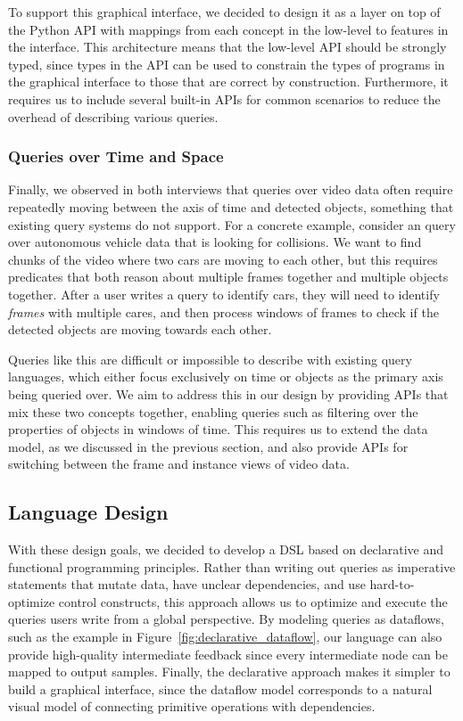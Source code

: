 To support this graphical interface, we decided to design it as a layer on top of the Python API with mappings from each concept in the low-level to features in the interface. This architecture means that the low-level API should be strongly typed, since types in the API can be used to constrain the types of programs in the graphical interface to those that are correct by construction. Furthermore, it requires us to include several built-in APIs for common scenarios to reduce the overhead of describing various queries.

\subsubsection{Queries over Time and Space}
Finally, we observed in both interviews that queries over video data often require repeatedly moving between the axis of time and detected objects, something that existing query systems do not support. For a concrete example, consider an query over autonomous vehicle data that is looking for collisions. We want to find chunks of the video where two cars are moving to each other, but this requires predicates that both reason about multiple frames together and multiple objects together. After a user writes a query to identify cars, they will need to identify \emph{frames} with multiple cares, and then process windows of frames to check if the detected objects are moving towards each other.

Queries like this are difficult or impossible to describe with existing query languages, which either focus exclusively on time or objects as the primary axis being queried over. We aim to address this in our design by providing APIs that mix these two concepts together, enabling queries such as filtering over the properties of objects in windows of time. This requires us to extend the data model, as we discussed in the previous section, and also provide APIs for switching between the frame and instance views of video data.

\subsection{Language Design}
With these design goals, we decided to develop a DSL based on declarative and functional programming principles. Rather than writing out queries as imperative statements that mutate data, have unclear dependencies, and use hard-to-optimize control constructs, this approach allows us to optimize and execute the queries users write from a global perspective. By modeling queries as dataflows, such as the example in Figure~\ref{fig:declarative_dataflow}, our language can also provide high-quality intermediate feedback since every intermediate node can be mapped to output samples. Finally, the declarative approach makes it simpler to build a graphical interface, since the dataflow model corresponds to a natural visual model of connecting primitive operations with dependencies.

